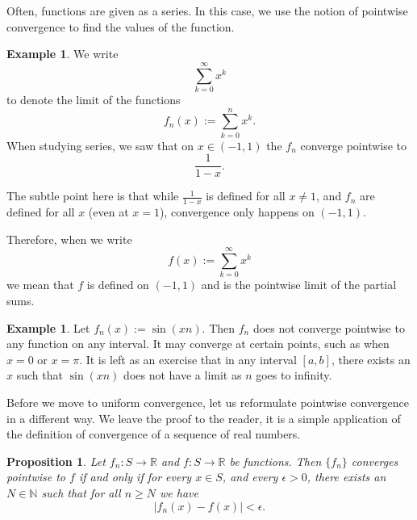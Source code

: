 \documentclass[12pt]{book}
\newcommand{\abs}[1]{\left\lvert {#1} \right\rvert}
\newcommand{\R}{{\mathbb{R}}}
\newcommand{\N}{{\mathbb{N}}}
\theoremstyle{plain}
\newtheorem{prop}[thm]{Proposition}
\theoremstyle{remark}
\theoremstyle{definition}
\theoremstyle{exercise}
\theoremstyle{example}
\newtheorem{example}[thm]{Example}
\begin{document}
Often, functions are given as a series.  In this case, we use
the notion of pointwise convergence to find the values of the function.

\begin{example} \label{exercise:geomsumptconv}
We write
\begin{equation*}
\sum_{k=0}^\infty x^k
\end{equation*}
to denote the limit of the functions
\begin{equation*}
f_n(x) := \sum_{k=0}^n x^k .
\end{equation*}
When studying series, 
we saw that on $x \in (-1,1)$ the $f_n$ converge pointwise to
\begin{equation*}
\frac{1}{1-x} .
\end{equation*}

The subtle point here is that while
$\frac{1}{1-x}$ is defined for all $x \not=1$, and $f_n$ are 
defined for all $x$ (even at $x=1$), convergence only happens on $(-1,1)$.

Therefore, when we write
\begin{equation*}
f(x) := \sum_{k=0}^\infty x^k
\end{equation*}
we mean that $f$ is defined on $(-1,1)$ and is the pointwise limit
of the partial sums.
\end{example}

\begin{example}
Let $f_n(x) := \sin(xn)$.  Then $f_n$ does not converge pointwise
to any function on any interval.  It may converge at certain points, such
as when $x=0$ or $x=\pi$.  It is left as an exercise that in any interval
$[a,b]$, there exists an $x$ such that $\sin(xn)$ does not have a limit
as $n$ goes to infinity.
\end{example}

Before we move to uniform convergence, let us reformulate pointwise
convergence in a different way.
We leave the proof to the reader, it is a simple application of the
definition of convergence of a sequence of real numbers.

\begin{prop} \label{ptwsconv:prop}
Let $f_n \colon S \to \R$ and $f \colon S \to \R$ be functions.
Then $\{ f_n \}$ converges pointwise to $f$ if and only if
for every $x \in S$, and every $\epsilon > 0$, there exists
an $N \in \N$ such that for all
$n \geq N$ we have
\begin{equation*}
\abs{f_n(x)-f(x)} < \epsilon .
\end{equation*}
\end{prop}
\end{document}
